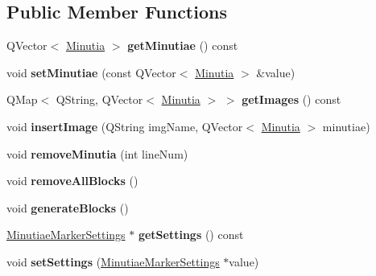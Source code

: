 \subsection*{Public Member Functions}
\begin{DoxyCompactItemize}
\item 
\mbox{\label{class_minutiae_marker_a129115fecd4bfb00f2026da4fc3e42b6}} 
Q\+Vector$<$ \mbox{\hyperlink{class_minutia}{Minutia}} $>$ {\bfseries get\+Minutiae} () const
\item 
\mbox{\label{class_minutiae_marker_ac8c0402ffc20bb0c42ff5a5f662d6877}} 
void {\bfseries set\+Minutiae} (const Q\+Vector$<$ \mbox{\hyperlink{class_minutia}{Minutia}} $>$ \&value)
\item 
\mbox{\label{class_minutiae_marker_a5d7b73dedcadded41e14660e43f4b0d5}} 
Q\+Map$<$ Q\+String, Q\+Vector$<$ \mbox{\hyperlink{class_minutia}{Minutia}} $>$ $>$ {\bfseries get\+Images} () const
\item 
\mbox{\label{class_minutiae_marker_a371f6e4327c0196e431df14763481438}} 
void {\bfseries insert\+Image} (Q\+String img\+Name, Q\+Vector$<$ \mbox{\hyperlink{class_minutia}{Minutia}} $>$ minutiae)
\item 
\mbox{\label{class_minutiae_marker_a39204385971e76b2d1fd7e6e9084c9eb}} 
void {\bfseries remove\+Minutia} (int line\+Num)
\item 
\mbox{\label{class_minutiae_marker_a52e3cb5e73dadf3c5f3d4adce53df272}} 
void {\bfseries remove\+All\+Blocks} ()
\item 
\mbox{\label{class_minutiae_marker_a9a2b3f700559c947c41369576e4b1f1e}} 
void {\bfseries generate\+Blocks} ()
\item 
\mbox{\label{class_minutiae_marker_a94ae6aa760dc0041528f7fc402262d9c}} 
\mbox{\hyperlink{class_minutiae_marker_settings}{Minutiae\+Marker\+Settings}} $\ast$ {\bfseries get\+Settings} () const
\item 
\mbox{\label{class_minutiae_marker_aa42fa18f6cd51662ec11c5b2e20a5499}} 
void {\bfseries set\+Settings} (\mbox{\hyperlink{class_minutiae_marker_settings}{Minutiae\+Marker\+Settings}} $\ast$value)
\end{DoxyCompactItemize}


